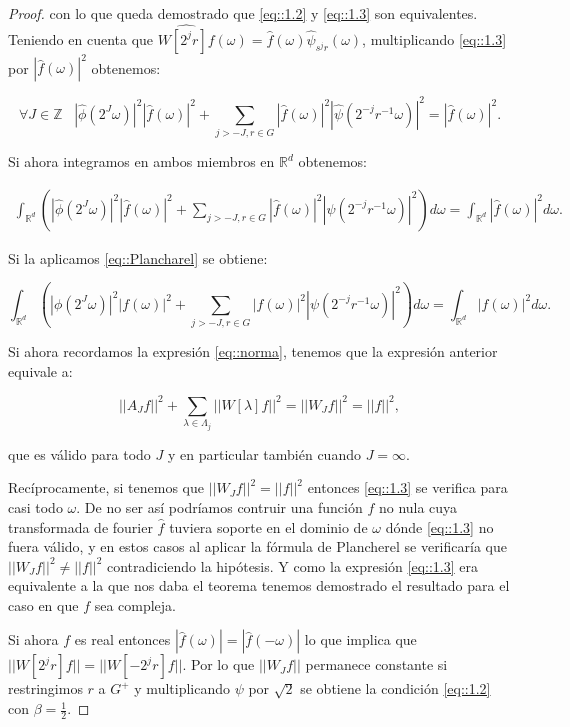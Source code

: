 \begin{proof}
\noindent con lo que queda demostrado que \eqref{eq::1.2} y \eqref{eq::1.3} son equivalentes. Teniendo en cuenta que $\widehat{W\left[2^jr\right]f}(\omega)=\widehat{f}(\omega)\widehat{\psi}_{s^jr}(\omega)$, multiplicando \eqref{eq::1.3} por $|\widehat{f}(\omega)|^2$ obtenemos: 

$$\forall J \in \mathbb{Z} \; \; \; \left|\widehat{\phi}\left(2^J\omega\right)\right|^2 \left|\widehat{f}(\omega)\right|^2 + \sum_{j>-J,r\in G}\left|\widehat{f}(\omega)\right|^2\left|\widehat{\psi}\left(2^{-j}r^{-1}\omega\right)\right|^2=\left|\widehat{f}(\omega)\right|^2.$$

\noindent Si ahora integramos en ambos miembros en $\mathbb{R}^d$ obtenemos: 

     \begin{align*}
        \int_{\mathbb{R}^d}\left(\left|\widehat{\phi}\left(2^J\omega\right)\right|^2 \left|\widehat{f}(\omega)\right|^2 + \sum_{j>-J,r\in G}\left|\widehat{f}(\omega)\right|^2\left|\widehat{\psi}\left(2^{-j}r^{-1}\omega\right)\right|^2 \right) d\omega=\int_{\mathbb{R}^d}\left|\widehat{f}(\omega)\right|^2 d\omega.
    \end{align*}

\noindent Si la aplicamos \eqref{eq::Plancharel} se obtiene:

$$\int_{\mathbb{R}^d}\left(\left|\phi\left(2^J\omega\right)\right|^2 \left|f(\omega)\right|^2 + \sum_{j>-J,r\in G}\left|f(\omega)\right|^2\left|\psi\left(2^{-j}r^{-1}\omega\right)\right|^2 \right) d\omega=\int_{\mathbb{R}^d}\left|f(\omega)\right|^2 d\omega.$$

\noindent Si ahora recordamos la expresión \eqref{eq::norma}, tenemos que la expresión anterior equivale a:

$$||A_Jf||^2+\sum_{\lambda \in \Lambda_j} ||W[\lambda]f||^2=||W_J f||^2=||f||^2,$$

\noindent que es válido para todo $J$ y en particular también cuando $J=\infty$.

\medskip

\noindent Recíprocamente, si tenemos que $||W_J f||^2=||f||^2$ entonces \eqref{eq::1.3} se verifica para casi todo $\omega$. De no ser así podríamos contruir una función $f$ no nula cuya transformada de fourier $\widehat{f}$ tuviera soporte en el dominio de $\omega$ dónde \eqref{eq::1.3} no fuera válido, y en estos casos al aplicar la fórmula de Plancherel se verificaría que $||W_J f||^2 \neq ||f||^2$ contradiciendo la hipótesis. Y como la expresión \eqref{eq::1.3} era equivalente a la que nos daba el teorema tenemos demostrado el resultado para el caso en que $f$ sea compleja. 

\medskip

\noindent Si ahora $f$ es real entonces $|\widehat{f}(\omega)|=|\widehat{f}(-\omega)|$ lo que implica que $||W[2^jr]f||=||W[-2^jr]f||$. Por lo que $||W_J f||$ permanece constante si restringimos $r$ a $G^+$ y multiplicando $\psi$ por $\sqrt{2}$ se obtiene la condición \eqref{eq::1.2} con $\beta=\frac{1}{2}$. \qedhere

\end{proof}

